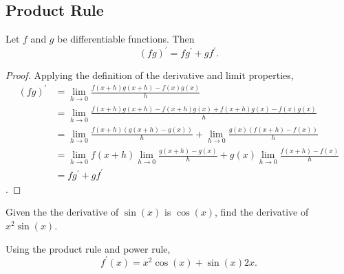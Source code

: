 \subsection{Product Rule}
\begin{lemma}
	Let $f$ and $g$ be differentiable functions. Then
	\begin{equation}
		(fg)^\prime = fg^\prime + gf^\prime.
	\end{equation}
\end{lemma}
\begin{proof}
	Applying the definition of the derivative and limit properties,
	\begin{align*}
		(fg)^\prime &= \lim_{h \to 0}{\frac{f(x+h)g(x+h) - f(x)g(x)}{h}} \\
		&= \lim_{h \to 0}{\frac{f(x+h)g(x+h)-f(x+h)g(x)+f(x+h)g(x)-f(x)g(x)}{h}} \\
		&= \lim_{h \to 0}{\frac{f(x+h)\left(g(x+h)-g(x)\right)}{h}} + \lim_{h \to 0}{\frac{g(x)\left(f(x+h)-f(x)\right)}{h}} \\
		&= \lim_{h \to 0}{f(x+h)} \lim_{h \to 0}{\frac{g(x+h)-g(x)}{h}} + g(x)\lim_{h \to 0}{\frac{f(x+h)-f(x)}{h}} \\
		&= fg^\prime + gf^\prime
	\end{align*}.
\end{proof}

\begin{example}
	Given the the derivative of $\sin{(x)}$ is $\cos{(x)}$, find the derivative of $x^2\sin{(x)}$.
\end{example}
Using the product rule and power rule,
\begin{equation*}
	f^\prime(x) = x^2\cos{(x)} + \sin{(x)}2x.
\end{equation*}